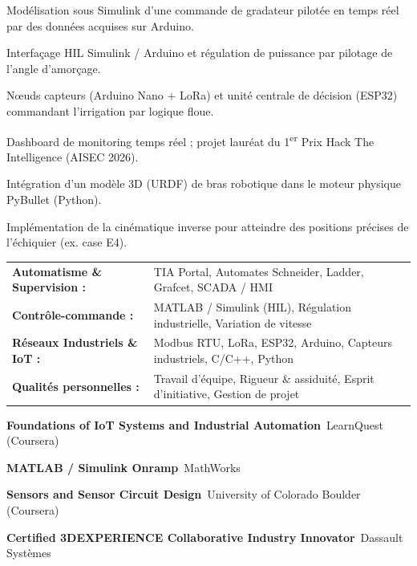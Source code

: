 \documentclass[10pt,a4paper]{../altacv}
\begin{document}
\begin{cvitems}
  \item Modélisation sous Simulink d’une commande de gradateur pilotée en temps réel par des données acquises sur Arduino.
  \item Interfaçage HIL Simulink / Arduino et régulation de puissance par pilotage de l’angle d’amorçage.
\end{cvitems}
\vspace{2pt}
\begin{cvitems}
  \item Nœuds capteurs (Arduino Nano + LoRa) et unité centrale de décision (ESP32) commandant l’irrigation par logique floue.
  \item Dashboard de monitoring temps réel ; projet lauréat du 1\textsuperscript{er} Prix Hack The Intelligence (AISEC 2026).
\end{cvitems}
\vspace{2pt}
\begin{cvitems}
  \item Intégration d’un modèle 3D (URDF) de bras robotique dans le moteur physique PyBullet (Python).
  \item Implémentation de la cinématique inverse pour atteindre des positions précises de l’échiquier (ex. case E4).
\end{cvitems}

{\small
\begin{tabular}{@{}ll@{}}
\textbf{Automatisme \& Supervision :} & TIA Portal, Automates Schneider, Ladder, Grafcet, SCADA / HMI \\[1.5pt]
\textbf{Contrôle-commande :} & MATLAB / Simulink (HIL), Régulation industrielle, Variation de vitesse \\[1.5pt]
\textbf{Réseaux Industriels \& IoT :} & Modbus RTU, LoRa, ESP32, Arduino, Capteurs industriels, C/C++, Python \\[1.5pt]
\textbf{Qualités personnelles :} & Travail d’équipe, Rigueur \& assiduité, Esprit d’initiative, Gestion de projet
\end{tabular}
}

\begin{cvitems}
  \item \textbf{Foundations of IoT Systems and Industrial Automation}~\hfill {\color{emphasis}LearnQuest (Coursera)}
  \item \textbf{MATLAB / Simulink Onramp}~\hfill {\color{emphasis}MathWorks}
  \item \textbf{Sensors and Sensor Circuit Design}~\hfill {\color{emphasis}University of Colorado Boulder (Coursera)}
  \item \textbf{Certified 3DEXPERIENCE Collaborative Industry Innovator}~\hfill {\color{emphasis}Dassault Systèmes}
\end{cvitems}

\cvactivites
\cvlangues
\end{document}
